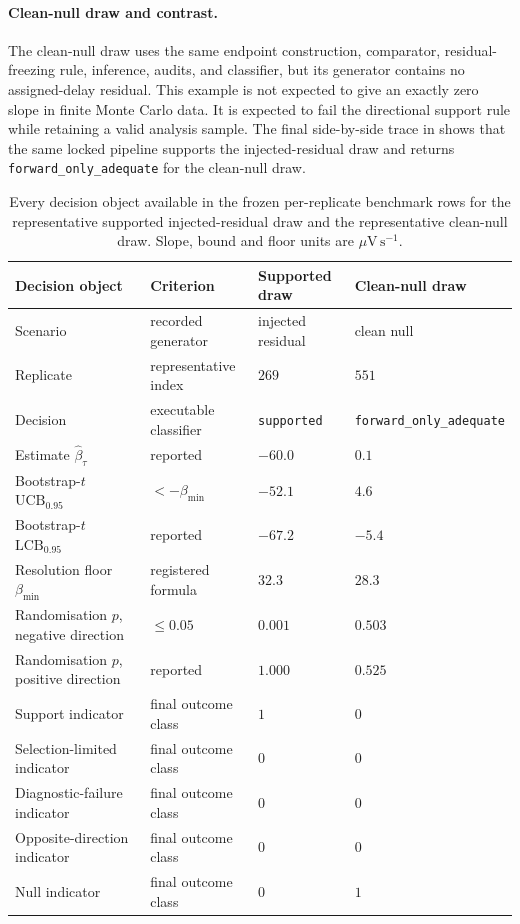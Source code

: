 \paragraph{Clean-null draw and contrast.}
The clean-null draw uses the same endpoint construction, comparator, residual-freezing rule, inference, audits, and classifier, but its generator contains no assigned-delay residual. This example is not expected to give an exactly zero slope in finite Monte Carlo data. It is expected to fail the directional support rule while retaining a valid analysis sample. The final side-by-side trace in  shows that the same locked pipeline supports the injected-residual draw and returns \texttt{forward\_only\_adequate} for the clean-null draw.

\begin{table}[t]
\centering
\caption{Every decision object available in the frozen per-replicate benchmark rows for the representative supported injected-residual draw and the representative clean-null draw. Slope, bound and floor units are \(\mu\mathrm{V\,s^{-1}}\).}
\label{tab:si-worked-decision}
\footnotesize
\setlength{\tabcolsep}{3.5pt}
\begin{tabularx}{\textwidth}{@{}p{3.9cm}p{3.0cm}p{3.0cm}p{3.0cm}@{}}
\toprule
Decision object & Criterion & Supported draw & Clean-null draw \\
\midrule
Scenario & recorded generator & injected residual & clean null \\
Replicate & representative index & \(269\) & \(551\) \\
Decision & executable classifier & \texttt{supported} & \texttt{forward\_only\_adequate} \\
Estimate \(\widehat\beta_\tau\) & reported & \(-60.0\) & \(0.1\) \\
Bootstrap-\(t\) \(\mathrm{UCB}_{0.95}\) & \(<-\beta_{\min}\) & \(-52.1\) & \(4.6\) \\
Bootstrap-\(t\) \(\mathrm{LCB}_{0.95}\) & reported & \(-67.2\) & \(-5.4\) \\
Resolution floor \(\beta_{\min}\) & registered formula & \(32.3\) & \(28.3\) \\
Randomisation \(p\), negative direction & \(\le 0.05\) & \(0.001\) & \(0.503\) \\
Randomisation \(p\), positive direction & reported & \(1.000\) & \(0.525\) \\
Support indicator & final outcome class & \(1\) & \(0\) \\
Selection-limited indicator & final outcome class & \(0\) & \(0\) \\
Diagnostic-failure indicator & final outcome class & \(0\) & \(0\) \\
Opposite-direction indicator & final outcome class & \(0\) & \(0\) \\
Null indicator & final outcome class & \(0\) & \(1\) \\
\bottomrule
\end{tabularx}
\end{table}
